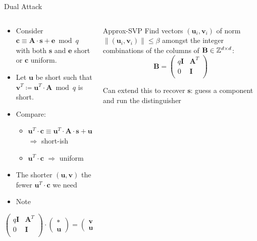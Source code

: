 \documentclass[xcolor=table,10pt,aspectratio=169]{beamer}
\renewcommand{\vec}[1]{\ensuremath{\mathbf{#1}}\xspace}
\providecommand{\mat}[1]{\ensuremath{\vec{#1}}\xspace}
\begin{document}
\begin{frame}[label={sec:org5b344e8}]{Dual Attack}
\begin{columns}
\begin{column}{0.6\columnwidth}
\begin{itemize}
\item Consider \(\vec{c} \equiv \mat{A} \cdot \vec{s} + \vec{e} \bmod q\) with both \(\vec{s}\) and \(\vec{e}\) short or \(\vec{c}\) uniform.
\item Let \(\vec{u}\) be short such that \(\vec{v}^{T} \coloneqq \vec{u}^{T} \cdot \mat{A} \bmod q\)  is short.
\item Compare:
\begin{itemize}
\item \(\vec{u}^{T} \cdot \vec{c} \equiv \vec{u}^{T} \cdot \vec{A} \cdot \vec{s} + \vec{u}^{T} \cdot \vec{e} \equiv \vec{v}^{T} \cdot \vec{s} + \vec{u}^{T}\cdot \vec{e}\)  \(\Rightarrow\) \alert{short-ish}
\item \(\vec{u}^{T} \cdot \vec{c}\) \(\Rightarrow\) \alert{uniform}
\end{itemize}
\item The shorter \((\vec{u},\vec{v})\) the fewer \(\vec{u}^{T} \cdot \vec{c}\) we need
\item Note
\end{itemize}
\[
  \begin{pmatrix}
    q\mathbf{I} & \mathbf{A}^{T}\\
    0 & \mathbf{I}\\
  \end{pmatrix} \cdot
  \begin{pmatrix}
    \vec{*}\\
    \vec{u}
  \end{pmatrix} = 
  \begin{pmatrix}
    \vec{v}\\
    \vec{u}
  \end{pmatrix}  
\]
\end{column}

\begin{column}{0.4\columnwidth}
\begin{alertblock}{Approx-SVP}
Find vectors \((\vec{u}_i, \vec{v}_i)\) of norm \(\|(\vec{u}_i, \vec{v}_i)\| \leq \beta\) amongst the integer combinations of the columns of \(\mat{B} \in \ZZ^{d \times d}\):
\[
  \mat{B} = \begin{pmatrix}
 q\mat{I} & \mat{A}^{T}\\
 0        & \mat{I}\\
  \end{pmatrix}
\]
\end{alertblock}

Can extend this to recover \(\vec{s}\): guess a component and run the distinguisher
\end{column}
\end{columns}
\end{frame}
\end{document}

